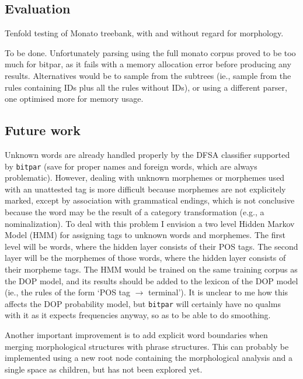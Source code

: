 \documentclass[10pt,a4paper]{article}
\begin{document}
\subsection{Evaluation}

Tenfold testing of Monato treebank, with and without regard for
morphology.

To be done. Unfortunately parsing using the full monato corpus proved to be
too much for bitpar, as it fails with a memory allocation error before
producing any results. Alternatives would be to sample from the subtrees (ie.,
sample from the rules containing IDs plus all the rules without IDs), or using
a different parser, one optimised more for memory usage.

\subsection{Future work}

Unknown words are already handled properly by the DFSA classifier supported by
\texttt{bitpar} (save for proper names and foreign words, which are always
problematic). However, dealing with unknown morphemes or morphemes used with an
unattested tag is more difficult because morphemes are not explicitely marked,
except by association with grammatical endings, which is not conclusive because
the word may be the result of a category transformation (e.g., a nominalization).
To deal with this problem I envision a two level Hidden Markov Model (HMM) for
assigning tags to unknown words and morphemes. The first level will be words,
where the hidden layer consists of their POS tags. The second layer will be the
morphemes of those words, where the hidden layer consists of their morpheme
tags. The HMM would be trained on the same training corpus as the DOP model,
and its results should be added to the lexicon of the DOP model (ie., the rules
of the form `POS tag $\rightarrow$ terminal'). It is unclear to me how this
affects the DOP probability model, but \texttt{bitpar} will certainly have no
qualms with it as it expects frequencies anyway, so as to be able to do
smoothing.

Another important improvement is to add explicit word boundaries when merging
morphological structures with phrase structures. This can probably be
implemented using a new root node containing the morphological analysis and a
single space as children, but has not been explored yet.
\end{document}
